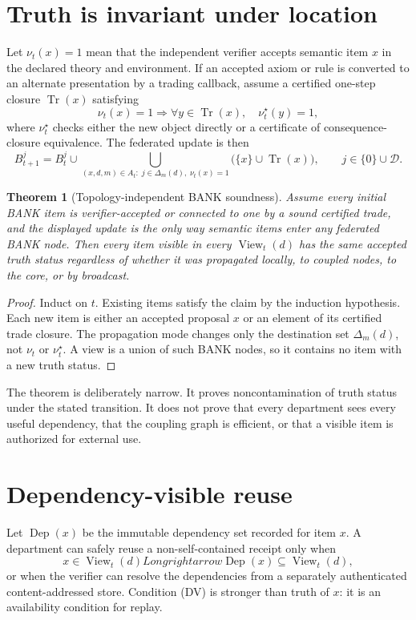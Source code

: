 \documentclass[11pt,oneside]{book}
\newtheorem{theorem}{Theorem}[chapter]
\theoremstyle{definition}
\theoremstyle{remark}
\newcommand{\Dep}{\operatorname{Dep}}
\newcommand{\View}{\operatorname{View}}
\begin{document}
\section{Truth is invariant under location}
Let \(\nu_t(x)=1\) mean that the independent verifier accepts semantic item \(x\) in the declared
theory and environment. If an accepted axiom or rule is converted to an alternate presentation by a
trading callback, assume a certified one-step closure \(\operatorname{Tr}(x)\) satisfying
\[
\nu_t(x)=1\Longrightarrow
\forall y\in\operatorname{Tr}(x),\quad \nu_t^\star(y)=1,
\]
where \(\nu_t^\star\) checks either the new object directly or a certificate of consequence-closure
equivalence. The federated update is then
\[
B_{t+1}^{j}=B_t^j\cup
\bigcup_{(x,d,m)\in A_t:\;j\in\Delta_m(d),\;\nu_t(x)=1}
\bigl(\{x\}\cup\operatorname{Tr}(x)\bigr),
\qquad j\in\{0\}\cup\mathcal D.
\]

\begin{theorem}[Topology-independent BANK soundness]
\label{thm:federated-soundness}
Assume every initial BANK item is verifier-accepted or connected to one by a sound certified trade,
and the displayed update is the only way semantic items enter any federated BANK node. Then every
item visible in every \(\View_t(d)\) has the same accepted truth status regardless of whether it was
propagated locally, to coupled nodes, to the core, or by broadcast.
\end{theorem}

\begin{proof}
Induct on \(t\). Existing items satisfy the claim by the induction hypothesis. Each new item is either
an accepted proposal \(x\) or an element of its certified trade closure. The propagation mode changes
only the destination set \(\Delta_m(d)\), not \(\nu_t\) or \(\nu_t^\star\). A view is a union of such
BANK nodes, so it contains no item with a new truth status.
\end{proof}

The theorem is deliberately narrow. It proves noncontamination of truth status under the stated
transition. It does not prove that every department sees every useful dependency, that the coupling
graph is efficient, or that a visible item is authorized for external use.

\section{Dependency-visible reuse}
Let \(\Dep(x)\) be the immutable dependency set recorded for item \(x\). A department can safely
reuse a non-self-contained receipt only when
\[
x\in\View_t(d)Longrightarrow \Dep(x)\subseteq\View_t(d),
\tag{DV}
\]
or when the verifier can resolve the dependencies from a separately authenticated content-addressed
store. Condition (DV) is stronger than truth of \(x\): it is an availability condition for replay.
\end{document}
